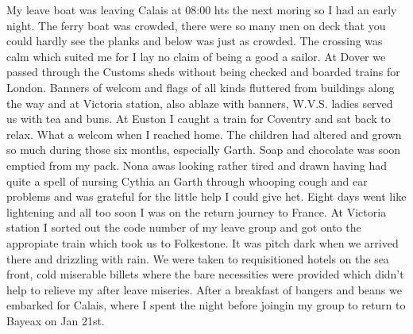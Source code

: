 My leave boat was leaving Calais at 08:00 hts the next moring so I had
an early night. The ferry boat was crowded, there were so many men on
deck that you could hardly see the planks and below was just as
crowded. The crossing was calm which suited me for I lay no claim of
being a good a sailor. At Dover we passed through the Customs sheds
without being checked and boarded trains for London. Banners of welcom
and flags of all kinds fluttered from buildings along the way and at
Victoria station, also ablaze with banners, W.V.S. ladies served us
with tea and buns. At Euston I caught a train for Coventry and sat
back to relax. What a welcom when I reached home. The children had
altered and grown so much during those six months, especially
Garth. Soap and chocolate was soon emptied from my pack. Nona awas
looking rather tired and drawn having had quite a spell of nursing
Cythia an Garth through whooping cough and ear problems and was
grateful for the little help I could give het. Eight days went like
lightening and all too soon I was on the return journey to France. At
Victoria station I sorted out the code number of my leave group and
got onto the appropiate train which took us to Folkestone. It was
pitch dark when we arrived there and drizzling with rain. We were
taken to requisitioned hotels on the sea front, cold miserable billets
where the bare necessities were provided which didn't help to relieve
my after leave miseries. After a breakfast of bangers and beans we
embarked for Calais, where I spent the night before joingin my group
to return to Bayeax on Jan 21st.

